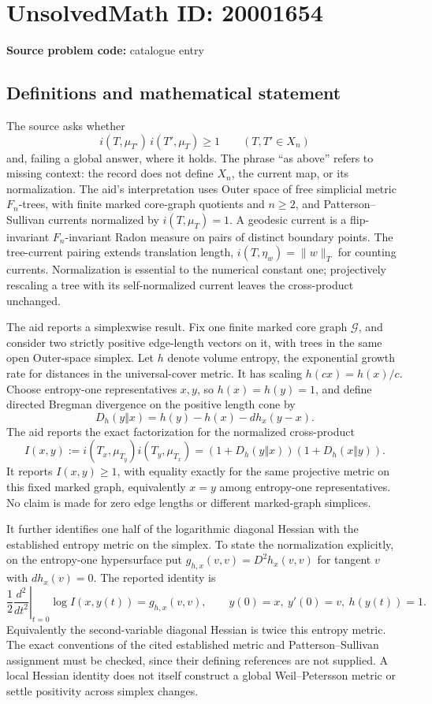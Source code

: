 \documentclass[11pt]{article}
\begin{document}
\section*{UnsolvedMath ID: 20001654}
\textbf{Source problem code:} catalogue entry
\subsection{Definitions and mathematical statement}
The source asks whether
\[
 i(T,\mu_{T'})\,i(T',\mu_T)\ge1\qquad(T,T'\in X_n)
\]
and, failing a global answer, where it holds. The phrase ``as above'' refers to missing context: the record does not define \(X_n\), the current map, or its normalization. The aid's interpretation uses Outer space of free simplicial metric \(F_n\)-trees, with finite marked core-graph quotients and \(n\ge2\), and Patterson--Sullivan currents normalized by \(i(T,\mu_T)=1\). A geodesic current is a flip-invariant \(F_n\)-invariant Radon measure on pairs of distinct boundary points. The tree-current pairing extends translation length, \(i(T,\eta_w)=\|w\|_T\) for counting currents. Normalization is essential to the numerical constant one; projectively rescaling a tree with its self-normalized current leaves the cross-product unchanged.

The aid reports a simplexwise result. Fix one finite marked core graph \(\mathcal G\), and consider two strictly positive edge-length vectors on it, with trees in the same open Outer-space simplex. Let \(h\) denote volume entropy, the exponential growth rate for distances in the universal-cover metric. It has scaling \(h(c x)=h(x)/c\). Choose entropy-one representatives \(x,y\), so \(h(x)=h(y)=1\), and define directed Bregman divergence on the positive length cone by
\[
 D_h(y\Vert x)=h(y)-h(x)-dh_x(y-x).
\]
The aid reports the exact factorization for the normalized cross-product
\[
 I(x,y):=i(T_x,\mu_{T_y})i(T_y,\mu_{T_x})
  =(1+D_h(y\Vert x))(1+D_h(x\Vert y)).
\]
It reports \(I(x,y)\ge1\), with equality exactly for the same projective metric on this fixed marked graph, equivalently \(x=y\) among entropy-one representatives. No claim is made for zero edge lengths or different marked-graph simplices.

It further identifies one half of the logarithmic diagonal Hessian with the established entropy metric on the simplex. To state the normalization explicitly, on the entropy-one hypersurface put \(g_{h,x}(v,v)=D^2h_x(v,v)\) for tangent \(v\) with \(dh_x(v)=0\). The reported identity is
\[
 \frac12\left.\frac{d^2}{dt^2}\right|_{t=0}
  \log I(x,y(t))=g_{h,x}(v,v),
 \qquad y(0)=x,\ y'(0)=v,\ h(y(t))=1.
\]
Equivalently the second-variable diagonal Hessian is twice this entropy metric. The exact conventions of the cited established metric and Patterson--Sullivan assignment must be checked, since their defining references are not supplied. A local Hessian identity does not itself construct a global Weil--Petersson metric or settle positivity across simplex changes.
\end{document}

